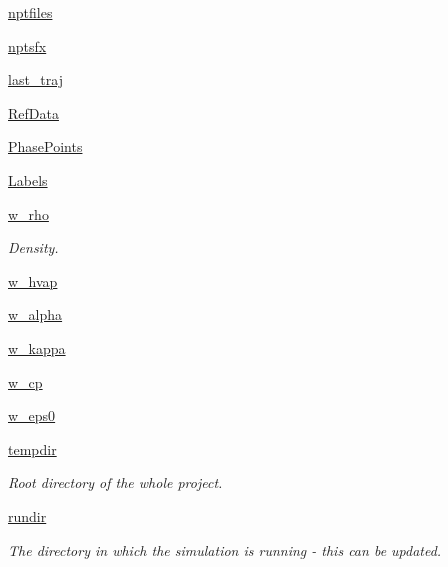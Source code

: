 \begin{DoxyCompactItemize}
\hyperlink{classforcebalance_1_1liquid_1_1Liquid_a748b44c6ea59a4a79bc8413e5d64b88a}{nptfiles}
\item 
\hyperlink{classforcebalance_1_1liquid_1_1Liquid_a13401c3bd91481f840975e95770c107d}{nptsfx}
\item 
\hyperlink{classforcebalance_1_1liquid_1_1Liquid_acf4158ed2337a04bdee3ee3f2f16283c}{last\-\_\-traj}
\item 
\hyperlink{classforcebalance_1_1liquid_1_1Liquid_a2567b4431d446cbe76e491c00ac9b6c1}{\-Ref\-Data}
\item 
\hyperlink{classforcebalance_1_1liquid_1_1Liquid_a2333919b4fc49482ed23b5e66eaa0ea8}{\-Phase\-Points}
\item 
\hyperlink{classforcebalance_1_1liquid_1_1Liquid_a16afa7eeca3234f74f60ac085dd8eb5b}{\-Labels}
\item 
\hyperlink{classforcebalance_1_1liquid_1_1Liquid_a677f8c01349a91716e10353633a4c5c1}{w\-\_\-rho}
\begin{DoxyCompactList}\small\item\em \-Density. \end{DoxyCompactList}\item 
\hyperlink{classforcebalance_1_1liquid_1_1Liquid_a7f43411fa6a9c39b63f1e82fe78ea597}{w\-\_\-hvap}
\item 
\hyperlink{classforcebalance_1_1liquid_1_1Liquid_a6ada133a0ceeb17e032f1337242afcf0}{w\-\_\-alpha}
\item 
\hyperlink{classforcebalance_1_1liquid_1_1Liquid_a19f8897aad045e3bf51eedba4606ac87}{w\-\_\-kappa}
\item 
\hyperlink{classforcebalance_1_1liquid_1_1Liquid_a614365b5ac24f312c564e4f8d2b7b4cf}{w\-\_\-cp}
\item 
\hyperlink{classforcebalance_1_1liquid_1_1Liquid_af99c11c0ba5bbfcbc53bc8d7d6125465}{w\-\_\-eps0}
\item 
\hyperlink{classforcebalance_1_1target_1_1Target_aede2856573b890cd47054ad36937d6f6}{tempdir}
\begin{DoxyCompactList}\small\item\em \-Root directory of the whole project. \end{DoxyCompactList}\item 
\hyperlink{classforcebalance_1_1target_1_1Target_a1da470037ef61c22dc44beb85cfa01a9}{rundir}
\begin{DoxyCompactList}\small\item\em \-The directory in which the simulation is running -\/ this can be updated. \end{DoxyCompactList}\item 

\end{DoxyCompactItemize}
